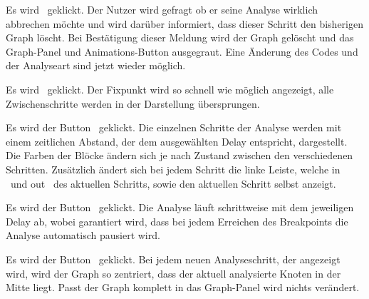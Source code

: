 

{Es wird \faStop\ geklickt.}
{Der Nutzer wird gefragt ob er seine Analyse wirklich abbrechen möchte und wird darüber informiert, dass dieser Schritt den bisherigen Graph löscht. Bei Bestätigung dieser Meldung wird der Graph gelöscht und das Graph-Panel und Animations-Button ausgegraut. Eine Änderung des Codes und der Analyseart sind jetzt wieder möglich.}



{Es wird \faPlay\ geklickt.}
{Der Fixpunkt wird so schnell wie möglich angezeigt, alle Zwischenschritte werden in der Darstellung übersprungen.}

{Es wird der Button \faPlay\ geklickt.}
{Die einzelnen Schritte der Analyse werden mit einem zeitlichen Abstand, der dem ausgewählten Delay entspricht, dargestellt. Die Farben der Blöcke ändern sich je nach Zustand zwischen den verschiedenen Schritten. Zusätzlich ändert sich bei jedem Schritt die linke Leiste, welche \glqq in \grqq\ und \glqq out \grqq\ des aktuellen Schritts, sowie den aktuellen Schritt selbst anzeigt.}

{Es wird der Button \faPlay\ geklickt.}
{Die Analyse läuft schrittweise mit dem jeweiligen Delay ab, wobei garantiert wird, dass bei jedem Erreichen des Breakpoints die Analyse automatisch pausiert wird.}

{Es wird der Button \faPlay\ geklickt.}
{Bei jedem neuen Analyseschritt, der angezeigt wird, wird der Graph so zentriert, dass der aktuell analysierte Knoten in der Mitte liegt. Passt der Graph komplett in das Graph-Panel wird nichts verändert.}




